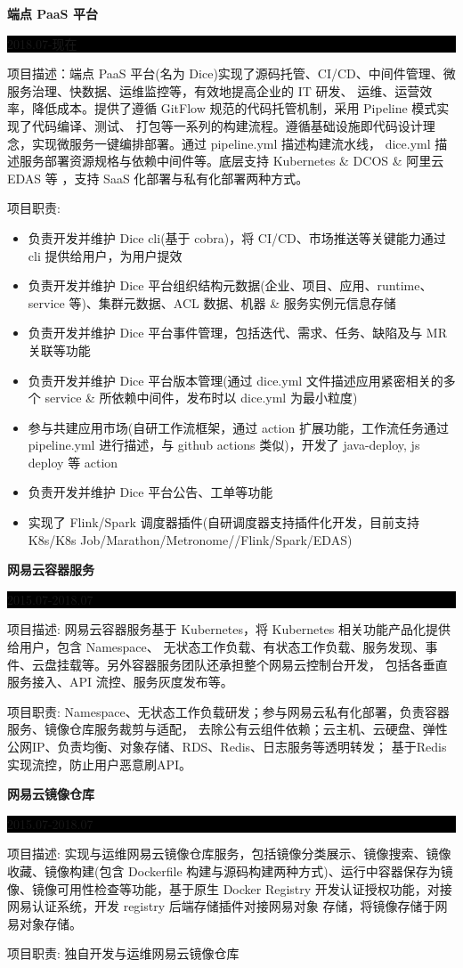 \documentclass[paper=a4,fontsize=11pt]{scrartcl} %
\newcommand{\sepspace}{\vspace*{1em}}		%
\newcommand{\SubSection}[2]{
	\sepspace \noindent \textbf{#1} \hfill      %
	\colorbox{Black}{\parbox{7em}{\hfill\color{White}#2}} \par  %
	\normalsize \par \sepspace}
\begin{document}
\begin{CJK}{UTF8}{gbsn}
\SubSection{端点 PaaS 平台}{2018.07-现在}
项目描述：端点 PaaS 平台(名为 Dice)实现了源码托管、CI/CD、中间件管理、微服务治理、快数据、运维监控等，有效地提高企业的 IT 研发、
运维、运营效率，降低成本。提供了遵循 GitFlow 规范的代码托管机制，采用 Pipeline 模式实现了代码编译、测试、
打包等一系列的构建流程。遵循基础设施即代码设计理念，实现微服务一键编排部署。通过 pipeline.yml 描述构建流水线，
dice.yml 描述服务部署资源规格与依赖中间件等。底层支持 Kubernetes \& DCOS \& 阿里云 EDAS 等 ，支持 SaaS 化部署与私有化部署两种方式。\par
\sepspace
项目职责:  
\begin{itemize}
\item 负责开发并维护 Dice cli(基于 cobra)，将 CI/CD、市场推送等关键能力通过 cli 提供给用户，为用户提效
\item 负责开发并维护 Dice 平台组织结构元数据(企业、项目、应用、runtime、service 等)、集群元数据、ACL 数据、机器 \& 服务实例元信息存储
\item 负责开发并维护 Dice 平台事件管理，包括迭代、需求、任务、缺陷及与 MR 关联等功能
\item 负责开发并维护 Dice 平台版本管理(通过 dice.yml 文件描述应用紧密相关的多个 service \& 所依赖中间件，发布时以 dice.yml 为最小粒度)
\item 参与共建应用市场(自研工作流框架，通过 action 扩展功能，工作流任务通过 pipeline.yml 进行描述，与 github actions 类似)，开发了 java-deploy, js deploy 等 action
\item 负责开发并维护 Dice 平台公告、工单等功能
\item 实现了 Flink/Spark 调度器插件(自研调度器支持插件化开发，目前支持 K8s/K8s Job/Marathon/Metronome//Flink/Spark/EDAS)
\end{itemize}

\SubSection{网易云容器服务}{2015.07-2018.07}
项目描述: 网易云容器服务基于 Kubernetes，将 Kubernetes 相关功能产品化提供给用户，包含 Namespace、
无状态工作负载、有状态工作负载、服务发现、事件、云盘挂载等。另外容器服务团队还承担整个网易云控制台开发，
包括各垂直服务接入、API 流控、服务灰度发布等。\par
\sepspace
项目职责: Namespace、无状态工作负载研发；参与网易云私有化部署，负责容器服务、镜像仓库服务裁剪与适配，
去除公有云组件依赖；云主机、云硬盘、弹性公网IP、负责均衡、对象存储、RDS、Redis、日志服务等透明转发；
基于Redis实现流控，防止用户恶意刷API。

\SubSection{网易云镜像仓库}{2015.07-2018.07}
项目描述: 实现与运维网易云镜像仓库服务，包括镜像分类展示、镜像搜索、镜像收藏、镜像构建(包含
Dockerfile 构建与源码构建两种方式)、运行中容器保存为镜像、镜像可用性检查等功能，基于原生
Docker Registry 开发认证授权功能，对接网易认证系统，开发 registry 后端存储插件对接网易对象
存储，将镜像存储于网易对象存储。\par
\sepspace
项目职责: 独自开发与运维网易云镜像仓库


\end{CJK}
\end{document}
